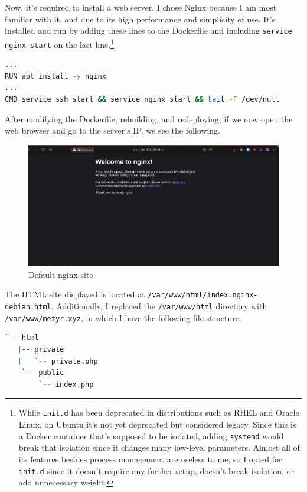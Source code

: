 \documentclass[a4paper]{article}
\newcommand{\abc}{\hfill \break}
\begin{document}
Now, it's required to install a web server. I chose Nginx because I am most familiar with it, and due to its high performance and simplicity of use.\abc
It’s installed and run by adding these lines to the Dockerfile and including \texttt{service nginx start} on the last line.\footnote{While \texttt{init.d} has been deprecated in distributions such as RHEL and Oracle Linux, on Ubuntu it's not yet deprecated but considered legacy. Since this is a Docker container that's supposed to be isolated, adding \texttt{systemd} would break that isolation since it changes many low-level parameters. Almost all of its features besides process management are useless to me, so I opted for \texttt{init.d} since it doesn't require any further setup, doesn't break isolation, or add unnecessary weight.}
\begin{lstlisting}[language=bash]
...
RUN apt install -y nginx
...
CMD service ssh start && service nginx start && tail -F /dev/null
\end{lstlisting}
After modifying the Dockerfile, rebuilding, and redeploying, if we now open the web browser and go to the server's IP, we see the following.
\begin{figure}[h]
	\includegraphics[scale=0.2]{images/nginx.png}
	\centering
	\caption[erm]{Default nginx site\footnotemark}
\end{figure}\abc{}\abc
The HTML site displayed is located at \texttt{/var/www/html/index.nginx-debian.html}.
Additionally, I replaced the \texttt{/var/www/html} directory with \texttt{/var/www/metyr.xyz}, in which I have the following file structure:
\begin{lstlisting}[language=bash]
`-- html
   |-- private
   |   `-- private.php
    `-- public
        `-- index.php
\end{lstlisting}
\end{document}
